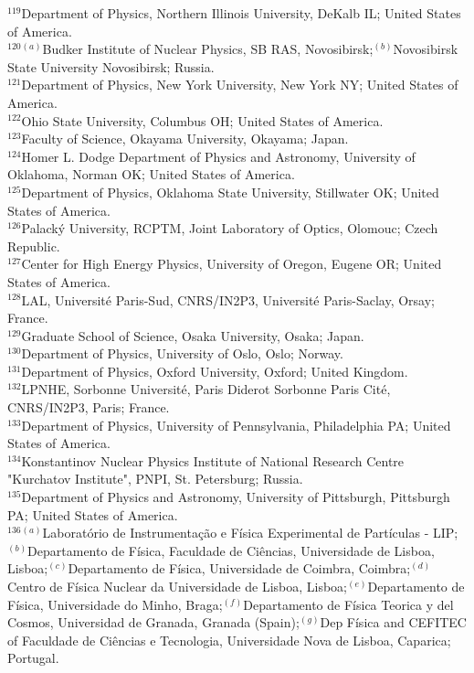 \begin{flushleft}
$^{119}$Department of Physics, Northern Illinois University, DeKalb IL; United States of America.\\
$^{120}$$^{(a)}$Budker Institute of Nuclear Physics, SB RAS, Novosibirsk;$^{(b)}$Novosibirsk State University Novosibirsk; Russia.\\
$^{121}$Department of Physics, New York University, New York NY; United States of America.\\
$^{122}$Ohio State University, Columbus OH; United States of America.\\
$^{123}$Faculty of Science, Okayama University, Okayama; Japan.\\
$^{124}$Homer L. Dodge Department of Physics and Astronomy, University of Oklahoma, Norman OK; United States of America.\\
$^{125}$Department of Physics, Oklahoma State University, Stillwater OK; United States of America.\\
$^{126}$Palack\'y University, RCPTM, Joint Laboratory of Optics, Olomouc; Czech Republic.\\
$^{127}$Center for High Energy Physics, University of Oregon, Eugene OR; United States of America.\\
$^{128}$LAL, Universit\'e Paris-Sud, CNRS/IN2P3, Universit\'e Paris-Saclay, Orsay; France.\\
$^{129}$Graduate School of Science, Osaka University, Osaka; Japan.\\
$^{130}$Department of Physics, University of Oslo, Oslo; Norway.\\
$^{131}$Department of Physics, Oxford University, Oxford; United Kingdom.\\
$^{132}$LPNHE, Sorbonne Universit\'e, Paris Diderot Sorbonne Paris Cit\'e, CNRS/IN2P3, Paris; France.\\
$^{133}$Department of Physics, University of Pennsylvania, Philadelphia PA; United States of America.\\
$^{134}$Konstantinov Nuclear Physics Institute of National Research Centre "Kurchatov Institute", PNPI, St. Petersburg; Russia.\\
$^{135}$Department of Physics and Astronomy, University of Pittsburgh, Pittsburgh PA; United States of America.\\
$^{136}$$^{(a)}$Laborat\'orio de Instrumenta\c{c}\~ao e F\'isica Experimental de Part\'iculas - LIP;$^{(b)}$Departamento de F\'isica, Faculdade de Ci\^{e}ncias, Universidade de Lisboa, Lisboa;$^{(c)}$Departamento de F\'isica, Universidade de Coimbra, Coimbra;$^{(d)}$Centro de F\'isica Nuclear da Universidade de Lisboa, Lisboa;$^{(e)}$Departamento de F\'isica, Universidade do Minho, Braga;$^{(f)}$Departamento de F\'isica Teorica y del Cosmos, Universidad de Granada, Granada (Spain);$^{(g)}$Dep F\'isica and CEFITEC of Faculdade de Ci\^{e}ncias e Tecnologia, Universidade Nova de Lisboa, Caparica; Portugal.\\

\end{flushleft}

